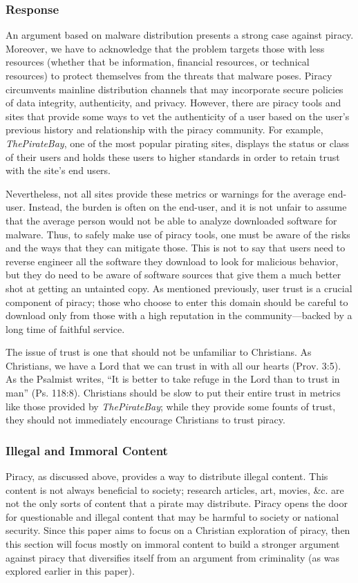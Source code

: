 \documentclass[onecolumn, 12pt]{article}
\begin{document}
\begin{refsection}
\subsubsection{Response}
An argument based on malware distribution presents a strong case against piracy.
Moreover, we have to acknowledge that the problem targets those with less
resources (whether that be information, financial resources, or technical
resources) to protect themselves from the threats that malware poses. Piracy
circumvents mainline distribution channels that may incorporate secure policies
of data integrity, authenticity, and privacy. However, there are piracy tools
and sites that provide some ways to vet the authenticity of a user based on the
user's previous history and relationship with the piracy community. For example,
\emph{ThePirateBay}, one of the most popular pirating sites, displays the status
or class of their users and holds these users to higher standards in order to
retain trust with the site's end users.~\cite{suprbay:status}

Nevertheless, not all sites provide these metrics or warnings for the average
end-user. Instead, the burden is often on the end-user, and it is not unfair to
assume that the average person would not be able to analyze downloaded software
for malware. Thus, to safely make use of piracy tools, one must be aware of the
risks and the ways that they can mitigate those. This is not to say that users
need to reverse engineer all the software they download to look for malicious
behavior, but they do need to be aware of software sources that give them a
much better shot at getting an untainted copy. As mentioned previously, user
trust is a crucial component of piracy; those who choose to enter this domain
should be careful to download only from those with a high reputation in the
community---backed by a long time of faithful service.

The issue of trust is one that should not be unfamiliar to Christians. As
Christians, we have a Lord that we can trust in with all our hearts (Prov. 3:5).
As the Psalmist writes, \enquote{It is better to take refuge in the Lord than
to trust in man} (Ps. 118:8). Christians should be slow to put their entire
trust in metrics like those provided by \emph{ThePirateBay}; while they provide
some founts of trust, they should not immediately encourage Christians to trust
piracy.

\subsubsection{Illegal and Immoral Content}
Piracy, as discussed above, provides a way to distribute illegal content. This
content is not always beneficial to society; research articles, art, movies, \&c.
are not the only sorts of content that a pirate may distribute. Piracy opens
the door for questionable and illegal content that may be harmful to society
or national security. Since this paper aims to focus on a Christian exploration
of piracy, then this section will focus mostly on immoral content to build a
stronger argument against piracy that diversifies itself from an argument from
criminality (as was explored earlier in this paper).


\end{refsection}
\end{document}
